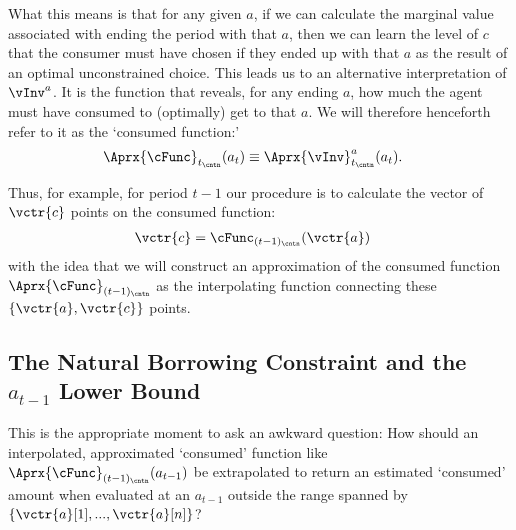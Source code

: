 What this means is that for any given $a$, if we can calculate the marginal value associated with ending the period with that $a$, then we can learn the level of $c$ that the consumer must have chosen if they ended up with that $a$ as the result of an optimal unconstrained choice.  This leads us to an alternative interpretation of $\vInv^{a}$. It is the function that reveals, for any ending $a$, how much the agent must have consumed to (optimally) get to that $a$.  We will therefore henceforth refer to it as the `consumed function:'
\begin{equation}\begin{gathered}\begin{aligned}
      \Aprx{\cFunc}_{t_\cntn}(a_{t}) & \equiv \Aprx{\vInv}^{a}_{t_\cntn}(a_{t}) \label{eq:consumedfn}.    
    \end{aligned}\end{gathered}\end{equation}

Thus, for example, for period $t-1$ our procedure is to calculate the vector of $\vctr{c}$ points on the consumed function:
\begin{equation}\begin{gathered}\begin{aligned}
      \vctr{c} & = \cFunc_{(t-1)_\cntn}(\vctr{a}) \label{eq:consumedfnvecs}     
    \end{aligned}\end{gathered}\end{equation}
with the idea that we will construct an approximation of the consumed function $\Aprx{\cFunc}_{(t-1)_\cntn}$ as the interpolating function connecting these $\{\vctr{a},\vctr{c}\}$ points.

\hypertarget{the-natural-borrowing-constraint-and-the-a-lower-bound}{}
\subsection{The Natural Borrowing Constraint and the $a_{t-1}$ Lower Bound} \label{subsec:LiqConstrSelfImposed}

This is the appropriate moment to ask an awkward question: How should an interpolated, approximated `consumed' function like $\Aprx{\cFunc}_{(t-1)_\cntn}(a_{t-1})$ be extrapolated to return an estimated `consumed' amount when evaluated at an $a_{t-1}$ outside the range spanned by $\{\vctr{a}[1],...,\vctr{a}[n]\}$?


